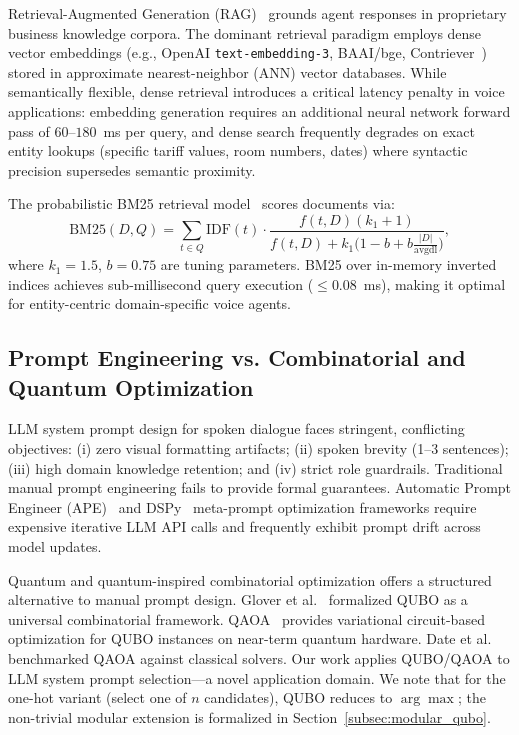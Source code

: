 \documentclass[11pt,a4paper]{article}
\begin{document}
Retrieval-Augmented Generation (RAG)~\cite{lewis2020retrieval} grounds agent responses in proprietary business knowledge corpora. The dominant retrieval paradigm employs dense vector embeddings (e.g., OpenAI \texttt{text-embedding-3}, BAAI/bge, Contriever~\cite{izacard2022unsupervised}) stored in approximate nearest-neighbor (ANN) vector databases. While semantically flexible, dense retrieval introduces a critical latency penalty in voice applications: embedding generation requires an additional neural network forward pass of $60$--$180$~ms per query, and dense search frequently degrades on exact entity lookups (specific tariff values, room numbers, dates) where syntactic precision supersedes semantic proximity.

The probabilistic BM25 retrieval model~\cite{robertson2009probabilistic} scores documents via:
\begin{equation}
\text{BM25}(D, Q) = \sum_{t \in Q} \text{IDF}(t) \cdot \frac{f(t,D)(k_1+1)}{f(t,D) + k_1\bigl(1-b+b\frac{|D|}{\text{avgdl}}\bigr)},
\label{eq:bm25}
\end{equation}
where $k_1 = 1.5$, $b = 0.75$ are tuning parameters. BM25 over in-memory inverted indices achieves sub-millisecond query execution ($\le 0.08$~ms), making it optimal for entity-centric domain-specific voice agents.

\subsection{Prompt Engineering vs. Combinatorial and Quantum Optimization}
\label{subsec:rw_prompting}

LLM system prompt design for spoken dialogue faces stringent, conflicting objectives: (i) zero visual formatting artifacts; (ii) spoken brevity (1--3 sentences); (iii) high domain knowledge retention; and (iv) strict role guardrails. Traditional manual prompt engineering fails to provide formal guarantees. Automatic Prompt Engineer (APE)~\cite{zhou2023ape} and DSPy~\cite{khattab2023dspy} meta-prompt optimization frameworks require expensive iterative LLM API calls and frequently exhibit prompt drift across model updates.

Quantum and quantum-inspired combinatorial optimization offers a structured alternative to manual prompt design. Glover et al.~\cite{glover2019quantum} formalized QUBO as a universal combinatorial framework. QAOA~\cite{farhi2014quantum} provides variational circuit-based optimization for QUBO instances on near-term quantum hardware. Date et al.~\cite{date2023combinatorial} benchmarked QAOA against classical solvers. Our work applies QUBO/QAOA to LLM system prompt selection---a novel application domain. We note that for the one-hot variant (select one of $n$ candidates), QUBO reduces to $\arg\max$; the non-trivial modular extension is formalized in Section~\ref{subsec:modular_qubo}.
\end{document}
